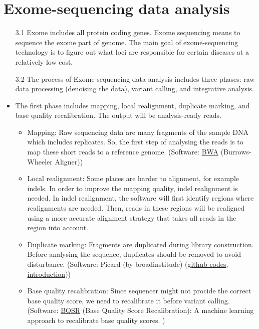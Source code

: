 \documentclass{article}
\begin{document}
\section{Exome-sequencing data analysis}
\begin{itemize}
    \item[3.1] Exome includes all protein coding genes. Exome sequencing means to sequence the exome part of genome. The main goal of exome-sequencing technology is to figure out what loci are responsible for certain diseases at a relatively low cost. 
    \item[3.2] The process of Exome-sequencing data analysis includes three phases: raw data processing (denoising the data), variant calling, and integrative analysis.
    \item The first phase includes mapping, local realignment, duplicate marking, and base quality recalibration. The output will be analysis-ready reads. 
    \begin{itemize}
        \item Mapping: Raw sequencing data are many fragments of the sample DNA which includes replicates. So, the first step of analysing the reads is to map these short reads to a reference genome. (Software: \href{http://bio-bwa.sourceforge.net}{BWA} (Burrows-Wheeler Aligner))
        \item Local realignment: Some places are harder to alignment, for example indels. In order to improve the mapping quality, indel realignment is needed. In indel realignment, the software will first identify regions where realignments are needed. Then, reads in these regions will be realigned using a more accurate alignment strategy that takes all reads in the region into account.
        \item Duplicate marking: Fragments are duplicated during library construction. Before analysing the sequence, duplicates should be removed to avoid disturbance. (Software: Picard (by broadinstitude) (\href{https://github.com/broadinstitute/picard}{github codes}, \href{https://gatk.broadinstitute.org/hc/en-us/articles/360037052812-MarkDuplicates-Picard-}{introduction}))
        \item Base quality recalibration: Since sequencer might not procide the correct base quality score, we need to recalibrate it before variant calling. (Software: \href{https://gatk.broadinstitute.org/hc/en-us/articles/360035890531-Base-Quality-Score-Recalibration-BQSR-}{BQSR} (Base Quality Score Recalibration): A machine learning approach to recalibrate base quality scores. )

\end{itemize}
\end{itemize}
\end{document}
